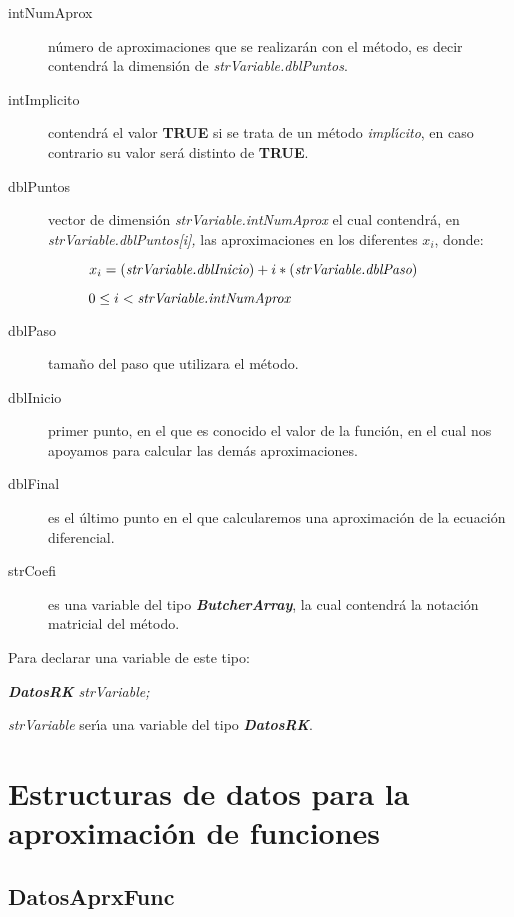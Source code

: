 \begin{description}
\item[intNumAprox] n\'umero de aproximaciones que se realizar\'an con el
m\'etodo, es decir contendr\'a la dimensi\'on de \emph{strVariable.dblPuntos}.
\item[intImplicito] contendr\'a el valor \textbf{TRUE} si se trata de un 
m\'etodo \emph{impl\'{\i}cito}, en caso contrario su valor ser\'a distinto de
\textbf{TRUE}.
\item[dblPuntos] vector de dimensi\'on \emph{strVariable.intNumAprox} el 
cual contendr\'a, en \emph{strVariable.dblPuntos[i],} 
las aproximaciones en los diferentes $x_i$, donde:

\begin{description}
\item[]$x_i = (\emph{strVariable.dblInicio}) + i * (\emph{strVariable.dblPaso})$
\item[]$0 \leq i < \emph{strVariable.intNumAprox}$
\end{description}

\item[dblPaso] tama\~no del paso que utilizara el m\'etodo.\newpage
\item[dblInicio] primer punto, en el que es conocido el valor de la funci\'on,
en el cual nos apoyamos para calcular las dem\'as aproximaciones.
\item[dblFinal] es el \'ultimo punto en el que calcularemos una aproximaci\'on
de la ecuaci\'on diferencial.
\item[strCoefi] es una variable del tipo \emph{\textbf{ButcherArray}}, la cual
contendr\'a la notaci\'on matricial del m\'etodo.
\end{description}

Para declarar una variable de este tipo:

\begin{center}
\emph{\textbf{DatosRK} strVariable;}
\end{center}

\emph{strVariable} ser\'{\i}a una variable del tipo \emph{\textbf{DatosRK}}.

\newpage

\section{Estructuras de datos para la aproximaci\'on de funciones}

\subsection{DatosAprxFunc} \label{sec:DatosAprxFunc}


